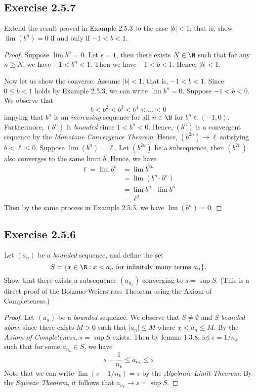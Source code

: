 \subsection{Exercise 2.5.7}
Extend the result proved in Example 2.5.3 to the case \(|b|<1\); that is, show \(\lim(b^n) = 0\) if and only if \(-1 < b < 1\). 
\begin{proof}
Suppose \(\lim b^n = 0 \). Let \( \epsilon = 1\), then there exists \( N \in \N \) such that for any \( n \geq N \), we have \( -1 < b^n < 1 \). Then we have \( -1 < b < 1 \). Hence, \( |b| < 1\). 

Now let us show the converse. Assume \( |b | < 1\); that is, \( -1 < b < 1 \). Since \( 0 \leq b < 1 \) holds by Example 2.5.3, we can write \( \lim b^n = 0  \). Suppose \( -1 < b < 0\). We observe that 
\[ b < b^2 < b^3 < b^4 < ... <  0\]
impying that \(b^n\) is an \textit{increasing} sequence for all \( n \in \N \) for \(b^n \in (-1, 0)\). Furthermore, \((b^n)\) is \textit{bounded} since \(1 < b^n < 0 \). Hence, \((b^n)\) is a convergent sequence by the \textit{Monotone Convergence Theorem}. Hence, \( (b^{2n}) \to \ell \) satisfying \( b < \ell \leq 0 \). Suppose \( \lim (b^n) = \ell\). Let \((b^{2n})\) be a subsequence, then \( (b^{2n})\) also converges to the same limit \(b \). Hence, we have 
\begin{align*}
    \ell = \lim b^n &= \lim b^{2n} \\
                 &= \lim (b^{n} \cdot b^{n}) \\
                 &= \lim b^n \cdot \lim b^n \\ 
                 &= \ell^2
\end{align*}
Then by the same process in Example 2.5.3, we have \( \lim (b^n) = 0 \).

\end{proof}

\subsection{Exercise 2.5.6}
Let \((a_n)\) be a \textit{bounded} sequence, and define the set 
\[ S = \{ x \in \R : x < a_n \text{ for infinitely many terms } a_n \}.\]
Show that there exists a subsequence \((a_{n_k})\) converging to \( s = \sup S\). (This is a direct proof of the Bolzano-Weierstrass Theorem using the Axiom of Completeness.) 

\begin{proof}
    Let \((a_n)\) be a \textit{bounded} sequence. We observe that \( S \neq \emptyset \) and \(S \) \textit{bounded above} since there exists \( M > 0\) such that \(|a_n| \leq M \) where \( x < a_n \leq M \). By the \textit{Axiom of Completeness}, \( s = \sup S \) exists. Then by lemma 1.3.8, let \( \epsilon = 1 / n_k \) such that for some \( a_{n_k} \in S \), we have 
    \[ s - \frac{1}{n_k} \leq a_{n_k} \leq s  \]
    Note that we can write \( \lim (s - 1 / n_k) = s \) by the \textit{Algebraic Limit Theorem}. By the \textit{Squeeze Theorem}, it follows that \( a_{n_k} \to s = \sup S\). 
\end{proof}

